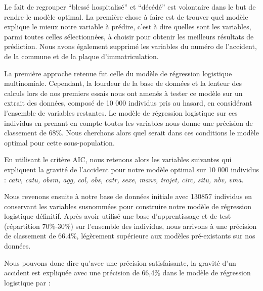 \documentclass[french,]{tp}
\begin{document}
Le fait de regrouper ``blessé hospitalisé'' et ``décédé'' est volontaire dans le but de rendre le modèle optimal. La première chose à faire est de trouver quel modèle explique le mieux notre variable à prédire, c'est à dire quelles sont les variables, parmi toutes celles sélectionnées, à choisir pour obtenir les meilleurs résultats de prédiction.
Nous avons également supprimé les variables du numéro de l'accident, de la commune et de la plaque d'immatriculation.

La première approche retenue fut celle du modèle de régression logistique multinomiale. Cependant, la lourdeur de la base de données et la lenteur des calculs lors de nos premiers essais nous ont amenés à tester ce modèle sur un extrait des données, composé de 10 000 individus pris au hasard, en considérant l'ensemble de variables restantes. Le modèle de régression logistique sur ces individus en prenant en compte toutes les variables nous donne une précision de classement de 68\%.
Nous cherchons alors quel serait dans ces conditions le modèle optimal pour cette sous-population.

En utilisant le critère AIC, nous retenons alors les variables suivantes qui expliquent la gravité de l'accident pour notre modèle optimal sur 10 000 individus : \emph{catv, catu, obsm, agg, col, obs, catr, sexe, manv, trajet, circ, situ, nbv, vma}.

Nous revenons ensuite à notre base de données initiale avec 130857 individus en conservant les variables susnommées pour construire notre modèle de régression logistique définitif. Après avoir utilisé une base d'apprentissage et de test (répartition 70\%-30\%) sur l'ensemble des individus, nous arrivons à une précision de classement de 66.4\%, légèrement supérieure aux modèles pré-existants sur nos données.

Nous pouvons donc dire qu'avec une précision satisfaisante, la gravité d'un accident est expliquée avec une précision de 66,4\% dans le modèle de régression logistique par :
\end{document}
